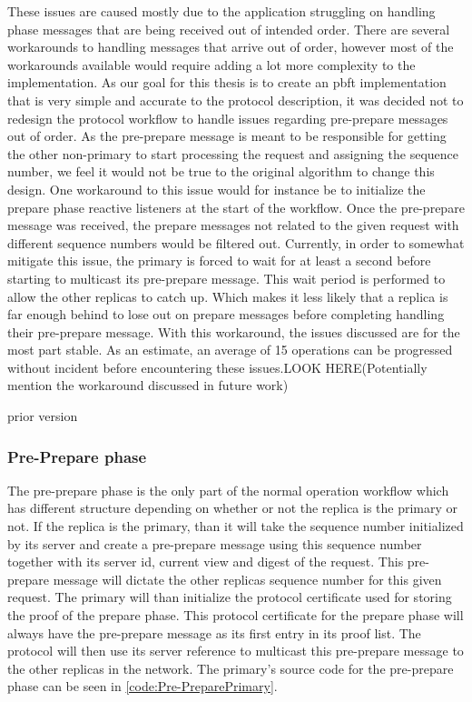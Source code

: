 These issues are caused mostly due to the application struggling on handling phase messages that are being received out of intended order. There are several workarounds to handling messages that arrive out of order, however most of the workarounds available would require adding a lot more complexity to the implementation. As our goal for this thesis is to create an \ac{pbft} implementation that is very simple and accurate to the protocol description, it was decided not to redesign the protocol workflow to handle issues regarding pre-prepare messages out of order. As the pre-prepare message is meant to be responsible for getting the other non-primary to start processing the request and assigning the sequence number, we feel it would not be true to the original algorithm to change this design. One workaround to this issue would for instance be to initialize the prepare phase reactive listeners at the start of the workflow. Once the pre-prepare message was received, the prepare messages not related to the given request with different sequence numbers would be filtered out. Currently, in order to somewhat mitigate this issue, the primary is forced to wait for at least a second before starting to multicast its pre-prepare message. This wait period is performed to allow the other replicas to catch up. Which makes it less likely that a replica is far enough behind to lose out on prepare messages before completing handling their pre-prepare message. With this workaround, the issues discussed are for the most part stable. As an estimate, an average of 15 operations can be progressed without incident before encountering these issues.LOOK HERE(Potentially mention the workaround discussed in future work)


\iffalse
prior version
\subsubsection{Pre-Prepare phase}
The pre-prepare phase is the only part of the normal operation workflow which has different structure depending on whether or not the replica is the primary or not. If the replica is the primary, than it will take the sequence number initialized by its server and create a pre-prepare message using this sequence number together with its server id, current view and digest of the request. This pre-prepare message will dictate the other replicas sequence number for this given request. The primary will than initialize the protocol certificate used for storing the proof of the prepare phase. This protocol certificate for the prepare phase will always have the pre-prepare message as its first entry in its proof list. The protocol will then use its server reference to multicast this pre-prepare message to the other replicas in the network. The primary's source code for the pre-prepare phase can be seen in \autoref{code:Pre-PreparePrimary}.

